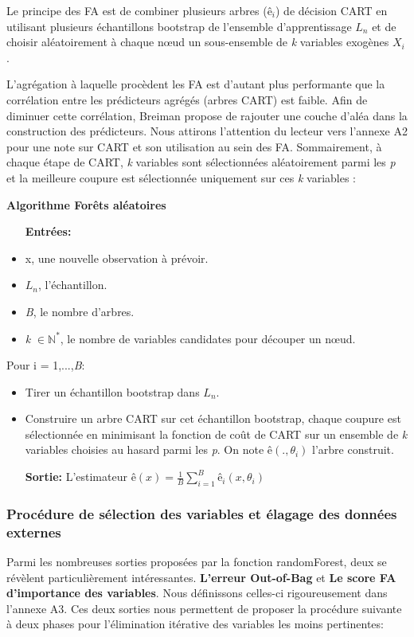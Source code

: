 	Le principe des FA est de combiner plusieurs arbres ($ê_i$) de décision CART\cite{BREI84} en utilisant plusieurs échantillons bootstrap de l'ensemble d'apprentissage \textbf{$L_n$} et de choisir aléatoirement à chaque nœud un sous-ensemble de \textit{k} variables exogènes $X_i$. 
	\par
	L'agrégation à laquelle procèdent les FA est d’autant plus performante que la corrélation entre les prédicteurs agrégés  (arbres CART) est faible. Afin de diminuer cette corrélation, Breiman\cite{BREI01} propose de rajouter une couche d’aléa dans la construction des
	prédicteurs.  Nous attirons l'attention du lecteur vers l'annexe A2 pour une note sur CART et son utilisation au sein des FA. Sommairement, à chaque étape de CART, \textit{k} variables sont sélectionnées aléatoirement parmi les \textit{p} et la meilleure coupure est sélectionnée uniquement sur ces \textit{k} variables : \par
	\textbf{Algorithme Forêts aléatoires}
	\begin{itemize}
	\item[\textbf{Entrées:}]
	\item x, une nouvelle observation à prévoir.
	\item \textit{$L_n$}, l'échantillon.
	\item \textit{B}, le nombre d'arbres.
	\item \textit{k} $\in \mathbb{N}^* $, le nombre de variables candidates pour découper un nœud.
	\end{itemize}
	Pour i = 1,...,\textit{B}:
	\begin{itemize}
	\item Tirer un échantillon bootstrap dans \textit{$L_n$}.
	\item Construire un arbre CART sur cet échantillon bootstrap, chaque coupure est sélectionnée
	en minimisant la fonction de coût de CART sur un ensemble de \textit{k} variables choisies au
	hasard parmi les \textit{p}. On note $ê(.,\theta_i)$ l’arbre construit.
	\item[\textbf{Sortie:}]L’estimateur ${ê(x) =  \frac{1}{B} \sum_{i=1}^{B} ê_i(x,\theta_i)}$
	\end{itemize}	
	\subsubsection{Procédure de sélection des variables et élagage des données externes}
	Parmi les nombreuses sorties proposées par la fonction randomForest, deux se révèlent particulièrement intéressantes. \textbf{L'erreur Out-of-Bag} et \textbf{Le score FA d'importance des variables}. Nous définissons celles-ci rigoureusement dans l'annexe A3. Ces deux sorties nous permettent de proposer la procédure suivante à deux phases pour l'élimination itérative des variables les moins pertinentes:
